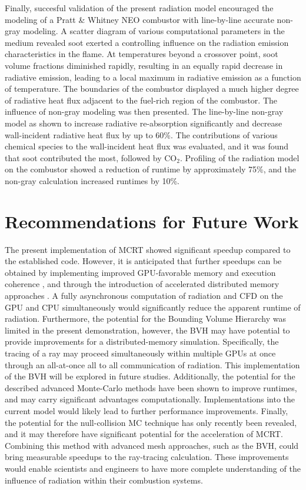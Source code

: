 Finally, succesful validation of the present radiation model encouraged the modeling of a Pratt \& Whitney NEO combustor with line-by-line accurate non-gray modeling. A scatter diagram of various computational parameters in the medium revealed soot exerted a controlling influence on the radiation emission characteristics in the flame. At temperatures beyond a crossover point, soot volume fractions diminished rapidly, resulting in an equally rapid decrease in radiative emission, leading to a local maximum in radiative emission as a function of temperature. The boundaries of the combustor displayed a much higher degree of radiative heat flux adjacent to the fuel-rich region of the combustor. The influence of non-gray modeling was then presented. The line-by-line non-gray model as shown to increase radiative re-absorption significantly and decrease wall-incident radiative heat flux by up to $60$\%. The contributions of various chemical species to the wall-incident heat flux was evaluated, and it was found that soot contributed the most, followed by CO$_2$. 
Profiling of the radiation model on the combustor showed a reduction of runtime by approximately 75\%, and the non-gray calculation increased runtimes by 10\%.

\section{Recommendations for Future Work}
The present implementation of MCRT showed significant speedup compared to the established code. However, it is anticipated that further speedups can be obtained by implementing improved GPU-favorable memory and execution coherence \cite{Silvestri2019ASimulation}, and through the introduction of accelerated distributed memory approaches \cite{Humphrey2015ATracing}. A fully asynchronous computation of radiation and CFD on the GPU and CPU simultaneously would significantly reduce the apparent runtime of radiation. Furthermore, the potential for the Bounding Volume Hierarchy was limited in the present demonstration, however, the BVH may have potential to provide improvements for a distributed-memory simulation. Specifically, the tracing of a ray may proceed simultaneously within multiple GPUs at once through an all-at-once all to all communication of radiation. This implementation of the BVH will be explored in future studies.
Additionally, the potential for the described advanced Monte-Carlo methods have been shown to improve runtimes, and may carry significant advantages computationally. Implementations into the current model would likely lead to further performance improvements. Finally, the potential for the null-collision MC technique has only recently been revealed, and it may therefore have significant potential for the acceleration of MCRT. Combining this method with advanced mesh approaches, such as the BVH, could bring measurable speedups to the ray-tracing calculation.
These improvements would enable scientists and engineers to have more complete understanding of the influence of radiation within their combustion systems. 